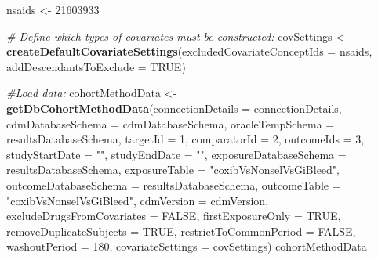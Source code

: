 \documentclass[]{article}
\newenvironment{Shaded}{\begin{snugshade}}{\end{snugshade}}
\newcommand{\CommentTok}[1]{\textcolor[rgb]{0.56,0.35,0.01}{\textit{#1}}}
\newcommand{\DataTypeTok}[1]{\textcolor[rgb]{0.13,0.29,0.53}{#1}}
\newcommand{\DecValTok}[1]{\textcolor[rgb]{0.00,0.00,0.81}{#1}}
\newcommand{\KeywordTok}[1]{\textcolor[rgb]{0.13,0.29,0.53}{\textbf{#1}}}
\newcommand{\NormalTok}[1]{#1}
\newcommand{\OtherTok}[1]{\textcolor[rgb]{0.56,0.35,0.01}{#1}}
\newcommand{\StringTok}[1]{\textcolor[rgb]{0.31,0.60,0.02}{#1}}
\begin{document}
\begin{Shaded}
\begin{Highlighting}[]
\NormalTok{nsaids <-}\StringTok{ }\DecValTok{21603933}

\CommentTok{# Define which types of covariates must be constructed:}
\NormalTok{covSettings <-}\StringTok{ }\KeywordTok{createDefaultCovariateSettings}\NormalTok{(}\DataTypeTok{excludedCovariateConceptIds =}\NormalTok{ nsaids,}
                                              \DataTypeTok{addDescendantsToExclude =} \OtherTok{TRUE}\NormalTok{)}

\CommentTok{#Load data:}
\NormalTok{cohortMethodData <-}\StringTok{ }\KeywordTok{getDbCohortMethodData}\NormalTok{(}\DataTypeTok{connectionDetails =}\NormalTok{ connectionDetails,}
                                          \DataTypeTok{cdmDatabaseSchema =}\NormalTok{ cdmDatabaseSchema,}
                                          \DataTypeTok{oracleTempSchema =}\NormalTok{ resultsDatabaseSchema,}
                                          \DataTypeTok{targetId =} \DecValTok{1}\NormalTok{,}
                                          \DataTypeTok{comparatorId =} \DecValTok{2}\NormalTok{,}
                                          \DataTypeTok{outcomeIds =} \DecValTok{3}\NormalTok{,}
                                          \DataTypeTok{studyStartDate =} \StringTok{""}\NormalTok{,}
                                          \DataTypeTok{studyEndDate =} \StringTok{""}\NormalTok{,}
                                          \DataTypeTok{exposureDatabaseSchema =}\NormalTok{ resultsDatabaseSchema,}
                                          \DataTypeTok{exposureTable =} \StringTok{"coxibVsNonselVsGiBleed"}\NormalTok{,}
                                          \DataTypeTok{outcomeDatabaseSchema =}\NormalTok{ resultsDatabaseSchema,}
                                          \DataTypeTok{outcomeTable =} \StringTok{"coxibVsNonselVsGiBleed"}\NormalTok{,}
                                          \DataTypeTok{cdmVersion =}\NormalTok{ cdmVersion,}
                                          \DataTypeTok{excludeDrugsFromCovariates =} \OtherTok{FALSE}\NormalTok{,}
                                          \DataTypeTok{firstExposureOnly =} \OtherTok{TRUE}\NormalTok{,}
                                          \DataTypeTok{removeDuplicateSubjects =} \OtherTok{TRUE}\NormalTok{,}
                                          \DataTypeTok{restrictToCommonPeriod =} \OtherTok{FALSE}\NormalTok{,}
                                          \DataTypeTok{washoutPeriod =} \DecValTok{180}\NormalTok{,}
                                          \DataTypeTok{covariateSettings =}\NormalTok{ covSettings)}
\NormalTok{cohortMethodData}
\end{Highlighting}
\end{Shaded}
\end{document}
